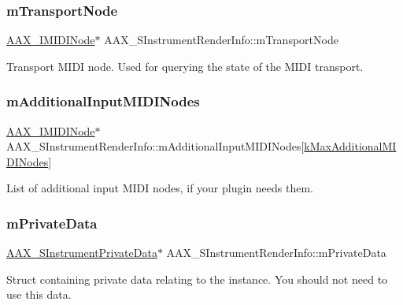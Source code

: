 \subsubsection{\texorpdfstring{mTransportNode}{mTransportNode}}
{\footnotesize\ttfamily \mbox{\hyperlink{a01845}{A\+A\+X\+\_\+\+I\+M\+I\+D\+I\+Node}}$\ast$ A\+A\+X\+\_\+\+S\+Instrument\+Render\+Info\+::m\+Transport\+Node}



Transport M\+I\+DI node. Used for querying the state of the M\+I\+DI transport. 

\mbox{\label{a01965_ab90074855c83148226feb8a64ac0b354}} 
\subsubsection{\texorpdfstring{mAdditionalInputMIDINodes}{mAdditionalInputMIDINodes}}
{\footnotesize\ttfamily \mbox{\hyperlink{a01845}{A\+A\+X\+\_\+\+I\+M\+I\+D\+I\+Node}}$\ast$ A\+A\+X\+\_\+\+S\+Instrument\+Render\+Info\+::m\+Additional\+Input\+M\+I\+D\+I\+Nodes\mbox{[}\mbox{\hyperlink{a00746_af66ae5854aedf3b38c6d6540670966b1}{k\+Max\+Additional\+M\+I\+D\+I\+Nodes}}\mbox{]}}



List of additional input M\+I\+DI nodes, if your plugin needs them. 

\mbox{\label{a01965_aff00dfa131d966478ab571ebcab7a86c}} 
\subsubsection{\texorpdfstring{mPrivateData}{mPrivateData}}
{\footnotesize\ttfamily \mbox{\hyperlink{a01961}{A\+A\+X\+\_\+\+S\+Instrument\+Private\+Data}}$\ast$ A\+A\+X\+\_\+\+S\+Instrument\+Render\+Info\+::m\+Private\+Data}



Struct containing private data relating to the instance. You should not need to use this data. 

\mbox{\label{a01965_a68ae865355f50537127d3e2e0efd585f}} 
